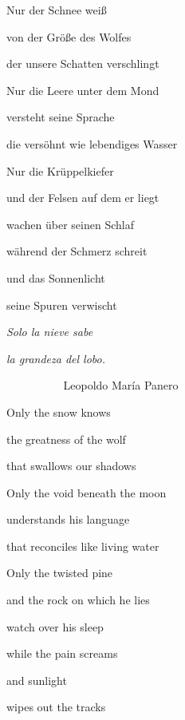 \documentclass[a4paper]{article}
\begin{document}
\bigskip

Nur der Schnee weiß

von der Größe des Wolfes

der unsere Schatten verschlingt


\bigskip

Nur die Leere unter dem Mond

versteht seine Sprache

die versöhnt wie lebendiges Wasser


\bigskip

Nur die Krüppelkiefer 

und der Felsen auf dem er liegt

wachen über seinen Schlaf


\bigskip

während der Schmerz schreit

und das Sonnenlicht

seine Spuren verwischt


\bigskip



\bigskip

{\itshape
Solo la nieve sabe}

{\itshape
la grandeza del lobo.}

\textit{\ \ \ \ \ \ \ \ \ \ }Leopoldo María Panero


\bigskip

Only the snow knows

the greatness of the wolf

that swallows our shadows


\bigskip

Only the void beneath the moon

understands his language

that reconciles like living water


\bigskip

Only the twisted pine

and the rock on which he lies

watch over his sleep


\bigskip

while the pain screams

and sunlight

wipes out the tracks


\bigskip


\bigskip



\bigskip
\end{document}
